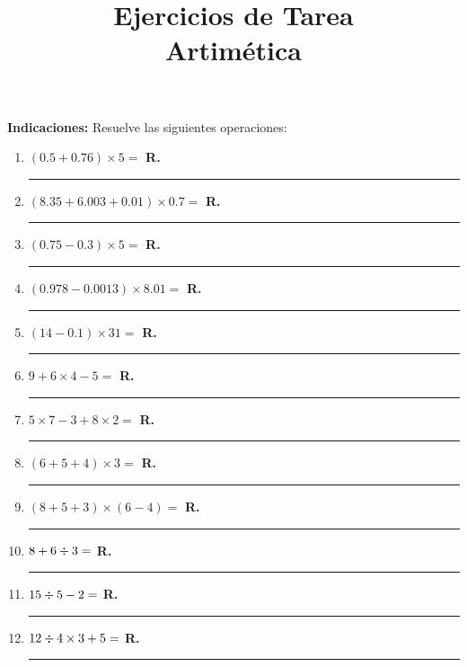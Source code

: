 

\title{Ejercicios de Tarea \\ {\Large Artimética}\vspace{-3ex}}
\author{}
\date{ }



\maketitle
\fontsize{14}{14}\selectfont

\textbf{Indicaciones: } Resuelve las siguientes operaciones:

\begin{enumerate}[label=\arabic*)]
\item $(0.5 + 0.76) \times 5 =$ \hspace{0.3cm} \textbf{R.} \rule{3cm}{0.1mm}
\item $(8.35 + 6.003 + 0.01) \times 0.7 =$ \hspace{0.3cm} \textbf{R.} \rule{3cm}{0.1mm}
\item $(0.75 - 0.3) \times 5 =$ \hspace{0.3cm} \textbf{R.} \rule{3cm}{0.1mm}
\item $(0.978 - 0.0013) \times 8.01 =$ \hspace{0.3cm} \textbf{R.} \rule{3cm}{0.1mm}
\item $(14 - 0.1) \times 31 =$ \hspace{0.3cm} \textbf{R.} \rule{3cm}{0.1mm}
\item $9 + 6 \times 4 - 5 =$ \hspace{0.3cm} \textbf{R.} \rule{3cm}{0.1mm}
\item $5 \times 7 - 3 + 8 \times 2 =$ \hspace{0.3cm} \textbf{R.} \rule{3cm}{0.1mm}
\item $(6 + 5 + 4) \times 3 =$ \hspace{0.3cm} \textbf{R.} \rule{3cm}{0.1mm}
\item $(8 + 5 + 3) \times (6  - 4) =$ \hspace{0.3cm} \textbf{R.} \rule{3cm}{0.1mm}
\item $8 + 6 \divisionsymbol 3 =$ \hspace{0.3cm} \textbf{R.} \rule{3cm}{0.1mm}
\item $15 \divisionsymbol 5 - 2 =$ \hspace{0.3cm} \textbf{R.} \rule{3cm}{0.1mm}
\item $12 \divisionsymbol 4 \times 3 + 5 =$ \hspace{0.3cm} \textbf{R.} \rule{3cm}{0.1mm}

\end{enumerate}
